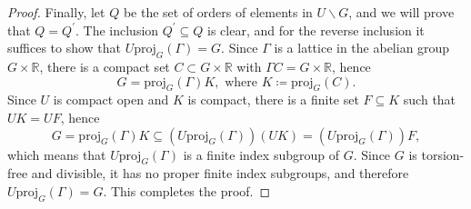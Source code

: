 \documentclass[10pt,a4paper]{amsart}
\begin{document}
\begin{proof}
Finally, let \(Q\) be the set of orders of elements in \(U\backslash G\), and we will prove that \(Q=Q^{\prime}\). The inclusion \(Q^{\prime}\subseteq Q\) is clear, and for the reverse inclusion it suffices to show that \(U\mathrm{proj}_{G}\left(\Gamma\right)=G\). Since \(\Gamma\) is a lattice in the abelian group \(G\times\mathbb{R}\), there is a compact set \(C\subset G\times\mathbb{R}\) with \(\Gamma C=G\times\mathbb{R}\), hence
\[G=\mathrm{proj}_{G}\left(\Gamma\right)K,\text{ where }K\coloneqq\mathrm{proj}_{G}\left(C\right).\]
Since \(U\) is compact open and \(K\) is compact, there is a finite set \(F\subseteq K\) such that \(UK=UF\), hence
\[G=\mathrm{proj}_{G}\left(\Gamma\right)K\subseteq\left(U\mathrm{proj}_{G}\left(\Gamma\right)\right)\left(UK\right)=\left(U\mathrm{proj}_{G}\left(\Gamma\right)\right)F,\]
which means that \(U\mathrm{proj}_{G}\left(\Gamma\right)\) is a finite index subgroup of \(G\). Since \(G\) is torsion-free and divisible, it has no proper finite index subgroups, and therefore \(U\mathrm{proj}_{G}\left(\Gamma\right)=G\). This completes the proof.
\end{proof}
\end{document}
